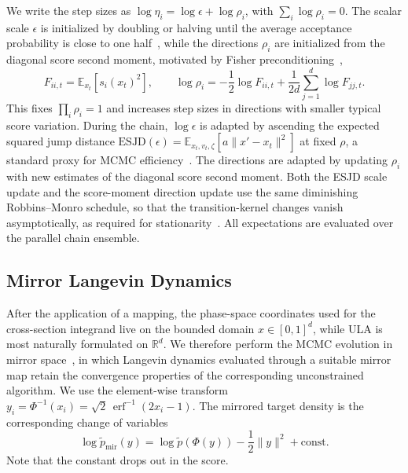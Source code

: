 \documentclass[11pt]{article}
\begin{document}
We write the step sizes as $\log\eta_i=\log\epsilon+\log\rho_i$, with $\sum_i\log\rho_i=0$.
The scalar scale $\epsilon$ is initialized by doubling or halving until the average acceptance probability is close to one half~\cite{hoffman2014no}, while the directions $\rho_i$ are initialized from the diagonal score second moment, motivated by Fisher preconditioning~\cite{girolami2011riemann,Titsias:2023},
\begin{equation}
  F_{ii,t} = \mathbb{E}_{x_t}\left[s_i(x_t)^2\right],
  \qquad
  \log\rho_i = -\frac{1}{2}\log F_{ii,t} + \frac{1}{2d}\sum_{j=1}^d \log F_{jj,t}.
\end{equation}
This fixes $\prod_i\rho_i=1$ and increases step sizes in directions with smaller typical score variation.
During the chain, $\log\epsilon$ is adapted by ascending the expected squared jump distance $\mathrm{ESJD}(\epsilon)= \mathbb{E}_{x_t,v_t,\zeta}\left[a \lVert x' - x_t \rVert^2\right]$ at fixed $\rho$, a standard proxy for MCMC efficiency~\cite{gelman1997weak,pasarica2010adaptively}.
The directions are adapted by updating $\rho_i$ with new estimates of the diagonal score second moment.
Both the ESJD scale update and the score-moment direction update use the same diminishing Robbins--Monro schedule, so that the transition-kernel changes vanish asymptotically, as required for stationarity~\cite{robbins1951stochastic,Roberts:2007adaptive}.
All expectations are evaluated over the parallel chain ensemble.

\subsection{Mirror Langevin Dynamics}
After the application of a mapping, the phase-space coordinates used for the cross-section integrand live on the bounded domain $x\in[0,1]^d$, while ULA is most naturally formulated on $\mathbb{R}^d$. 
We therefore perform the MCMC evolution in mirror space~\cite{Hsieh:2018mld}, in which Langevin dynamics evaluated through a suitable mirror map retain the convergence properties of the corresponding unconstrained algorithm.
We use the element-wise transform $y_i = \Phi^{-1}(x_i) = \sqrt{2}\,\operatorname{erf}^{-1}(2x_i-1)$.
The mirrored target density is the corresponding change of variables
\begin{equation}
  \log \widetilde{p}_{\mathrm{mir}}(y) = \log \widetilde{p}(\Phi(y)) - \frac{1}{2}\lVert y\rVert^2 + \mathrm{const.}
\end{equation}
Note that the constant drops out in the score. 
\end{document}
